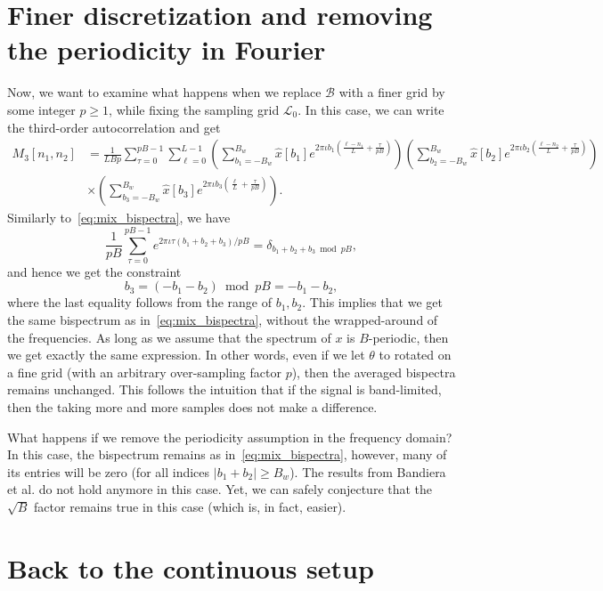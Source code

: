 \documentclass[english,12pt]{article}
\newcommand{\I}{\iota}
\newcommand{\tB}{B_w}
\numberwithin{equation}{section}
\begin{document}
\section{Finer discretization and removing the periodicity in Fourier}

Now, we want to examine what happens when we replace $\mathcal{B}$ with a finer grid by some integer $p\geq 1$, while fixing the sampling grid $\mathcal{L}_0$. 
In this case, we can write  the third-order autocorrelation and get 
\begin{equation}
\begin{split}
M_3[n_1,n_2] 
&= \frac{1}{LBp}\sum_{\tau=0}^{pB-1}\sum_{\ell=0}^{L-1} 
\left(\sum_{b_1=-\tB}^{\tB}\hat{x}[b_1]e^{2\pi\I b_1 \left(\frac{\ell-n_1}{L} + \frac{\tau}{pB}\right) }\right) 
\left(\sum_{b_2=-\tB}^{\tB}\hat{x}[b_2]e^{2\pi\I b_2 \left(\frac{\ell-n_2}{L} + \frac{\tau}{pB}\right) } \right) \\
&\times \left(\sum_{b_3=-\tB}^{\tB}\hat{x}[b_3]e^{2\pi\I b_3 \left(\frac{\ell}{L} + \frac{\tau}{pB}\right) }\right). 
\end{split}
\end{equation}
Similarly to~\eqref{eq:mix_bispectra}, we have
\begin{equation} \label{eq:sum2}
\frac{1}{pB}\sum_{\tau=0}^{pB-1}e^{2\pi\I\tau (b_1+b_2+b_3)/pB} = \delta_{b_1+b_2+b_3\bmod pB},
\end{equation}
and hence we get the constraint $$b_3=(-b_1-b_2)\bmod pB=-b_1-b_2,$$
where the last equality follows from the range of $b_1,b_2$.
This implies that we get the same bispectrum as in~\eqref{eq:mix_bispectra}, without the wrapped-around of the frequencies. As long as we assume that the spectrum of $x$ is $B$-periodic, then we get exactly the same expression. 
In other words, even if we let $\theta$ to rotated on a fine grid (with an arbitrary over-sampling factor $p$), then the averaged bispectra remains unchanged.
This follows the intuition that if the signal is band-limited, then the taking more and more samples does not make a difference. 

What happens if we remove the periodicity assumption in the frequency domain? In this case, the bispectrum remains as in~\eqref{eq:mix_bispectra}, however, many of its entries will be zero (for all indices $\vert b_1+b_2\vert \geq \tB$). The results from Bandiera et al. do not hold anymore in this case. Yet, we can safely conjecture that the $\sqrt{B}$ factor remains true in this case (which is, in fact, easier).  


\section{Back to the continuous setup}
\end{document}
